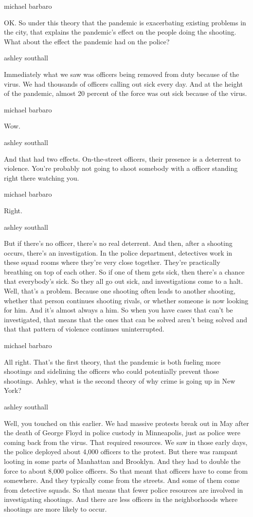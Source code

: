 michael barbaro

OK. So under this theory that the pandemic is exacerbating existing
problems in the city, that explains the pandemic's effect on the people
doing the shooting. What about the effect the pandemic had on the
police?

ashley southall

Immediately what we saw was officers being removed from duty because of
the virus. We had thousands of officers calling out sick every day. And
at the height of the pandemic, almost 20 percent of the force was out
sick because of the virus.

michael barbaro

Wow.

ashley southall

And that had two effects. On-the-street officers, their presence is a
deterrent to violence. You're probably not going to shoot somebody with
a officer standing right there watching you.

michael barbaro

Right.

ashley southall

But if there's no officer, there's no real deterrent. And then, after a
shooting occurs, there's an investigation. In the police department,
detectives work in these squad rooms where they're very close together.
They're practically breathing on top of each other. So if one of them
gets sick, then there's a chance that everybody's sick. So they all go
out sick, and investigations come to a halt. Well, that's a problem.
Because one shooting often leads to another shooting, whether that
person continues shooting rivals, or whether someone is now looking for
him. And it's almost always a him. So when you have cases that can't be
investigated, that means that the ones that can be solved aren't being
solved and that that pattern of violence continues uninterrupted.

michael barbaro

All right. That's the first theory, that the pandemic is both fueling
more shootings and sidelining the officers who could potentially prevent
those shootings. Ashley, what is the second theory of why crime is going
up in New York?

ashley southall

Well, you touched on this earlier. We had massive protests break out in
May after the death of George Floyd in police custody in Minneapolis,
just as police were coming back from the virus. That required resources.
We saw in those early days, the police deployed about 4,000 officers to
the protest. But there was rampant looting in some parts of Manhattan
and Brooklyn. And they had to double the force to about 8,000 police
officers. So that meant that officers have to come from somewhere. And
they typically come from the streets. And some of them come from
detective squads. So that means that fewer police resources are involved
in investigating shootings. And there are less officers in the
neighborhoods where shootings are more likely to occur.

